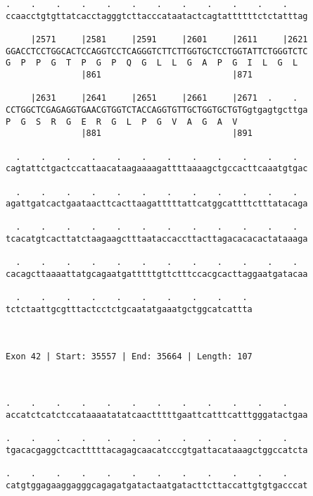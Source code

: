 \documentclass{article}
\begin{document}
\begin{Verbatim}
.    .    .    .    .    .    .    .    .    .    .    .    
ccaacctgtgttatcacctagggtcttacccataatactcagtattttttctctatttag
                                                            
     |2571     |2581     |2591     |2601     |2611     |2621
GGACCTCCTGGCACTCCAGGTCCTCAGGGTCTTCTTGGTGCTCCTGGTATTCTGGGTCTC
G  P  P  G  T  P  G  P  Q  G  L  L  G  A  P  G  I  L  G  L  
               |861                          |871           
  
     |2631     |2641     |2651     |2661     |2671  .    .  
CCTGGCTCGAGAGGTGAACGTGGTCTACCAGGTGTTGCTGGTGCTGTGgtgagtgcttga
P  G  S  R  G  E  R  G  L  P  G  V  A  G  A  V              
               |881                          |891           
  
  .    .    .    .    .    .    .    .    .    .    .    .  
cagtattctgactccattaacataagaaaagattttaaaagctgccacttcaaatgtgac
                                                            
  .    .    .    .    .    .    .    .    .    .    .    .  
agattgatcactgaataacttcacttaagatttttattcatggcattttctttatacaga
                                                            
  .    .    .    .    .    .    .    .    .    .    .    .  
tcacatgtcacttatctaagaagctttaataccaccttacttagacacacactataaaga
                                                            
  .    .    .    .    .    .    .    .    .    .    .    .  
cacagcttaaaattatgcagaatgatttttgttctttccacgcacttaggaatgatacaa
                                                            
  .    .    .    .    .    .    .    .    .    . 
tctctaattgcgtttactcctctgcaatatgaaatgctggcatcattta
                                                 
                                                 
 
Exon 42 | Start: 35557 | End: 35664 | Length: 107



.    .    .    .    .    .    .    .    .    .    .    .    
accatctcatctccataaaatatatcaactttttgaattcatttcatttgggatactgaa
                                                            
.    .    .    .    .    .    .    .    .    .    .    .    
tgacacgaggctcactttttacagagcaacatcccgtgattacataaagctggccatcta
                                                            
.    .    .    .    .    .    .    .    .    .    .    .    
catgtggagaaggagggcagagatgatactaatgatacttcttaccattgtgtgacccat
                                                            

\end{Verbatim}
\end{document}
